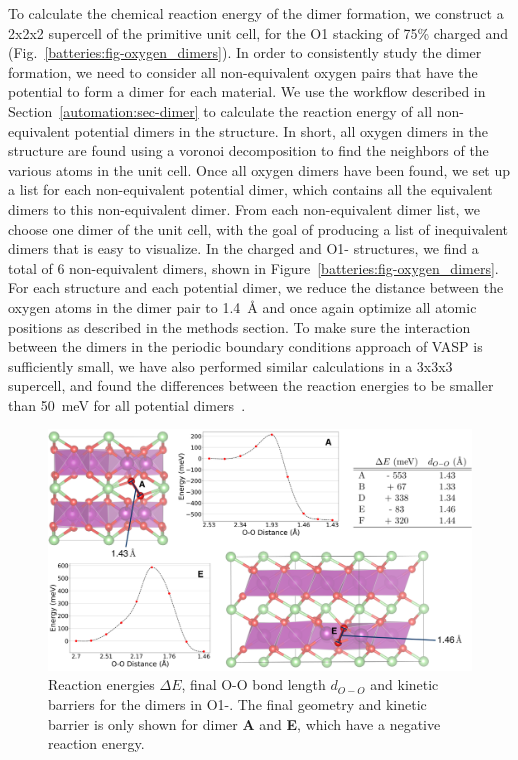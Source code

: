 \begin{refsection}
To calculate the chemical reaction energy of the dimer formation, we construct 
a 2x2x2 supercell of the primitive unit cell, for the O1 stacking of 75\% 
charged  and  
(Fig.~\ref{batteries:fig-oxygen_dimers}). In order to consistently study the 
dimer formation, we need to consider all non-equivalent oxygen pairs that have 
the potential to form a dimer for each material. We use the workflow described 
in Section~\ref{automation:sec-dimer} to calculate the reaction energy of all
non-equivalent potential dimers in the structure. In short, all oxygen dimers 
in the structure are found using a voronoi decomposition to find the neighbors 
of the various atoms in the unit cell. Once all oxygen dimers have been found, 
we set up a list for each non-equivalent potential dimer, which contains all 
the equivalent dimers to this non-equivalent dimer. From each non-equivalent 
dimer list, we choose one dimer of the unit cell, with the goal of producing a 
list of inequivalent dimers that is easy to visualize. In the charged 
 and O1- structures, we find a total of 6 
non-equivalent dimers, shown in Figure~\ref{batteries:fig-oxygen_dimers}. For 
each structure and each potential dimer, we reduce the distance between the 
oxygen atoms in the dimer pair to 1.4~\si{\angstrom} and once again optimize 
all atomic positions as described in the methods section. To make sure the 
interaction between the dimers in the periodic boundary conditions approach of 
VASP is sufficiently small, we have also performed similar calculations in a 
3x3x3 supercell, and found the differences between the reaction energies to be 
smaller than 50~\si{\milli\electronvolt} for all potential 
dimers~\cite{Levi2020}. 
 
\begin{figure}[ht] 
\centering
\captionsetup{width=0.9\linewidth}
\includegraphics[width=\textwidth]{Figures/batteries/dimer_energetics.png} 
\caption{Reaction energies $\Delta E$, final O-O bond length $d_{O-O}$ and 
kinetic barriers for the dimers in O1-. The final geometry 
and kinetic barrier is only shown for dimer \textbf{A} and \textbf{E}, which 
have a negative reaction energy.} 
\label{batteries:fig-Mn_dimers} 
\end{figure} 
 

\end{refsection}
